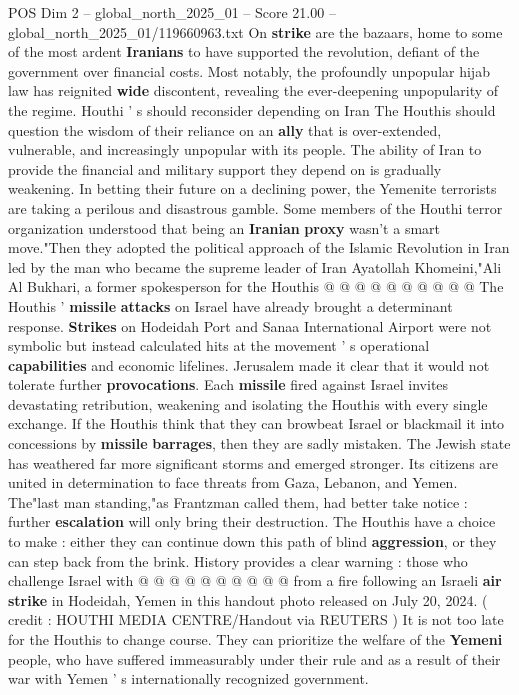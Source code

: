 \begin{textsample}{POS Dim 2 – global\_north\_2025\_01 – Score 21.00 – global\_north\_2025\_01/119660963.txt}
On \textbf{strike} are the bazaars, home to some of the most ardent \textbf{Iranians} to have supported the revolution, defiant of the government over financial costs.
Most notably, the profoundly unpopular hijab law has reignited \textbf{wide} discontent, revealing the ever-deepening unpopularity of the regime.
Houthi ' s should reconsider depending on Iran The Houthis should question the wisdom of their reliance on an \textbf{ally} that is over-extended, vulnerable, and increasingly unpopular with its people.
The ability of Iran to provide the financial and military support they depend on is gradually weakening.
In betting their future on a declining power, the Yemenite terrorists are taking a perilous and disastrous gamble.
Some members of the Houthi terror organization understood that being an \textbf{Iranian} \textbf{proxy} wasn't a smart move."Then they adopted the political approach of the Islamic Revolution in Iran led by the man who became the supreme leader of Iran Ayatollah Khomeini,"Ali Al Bukhari, a former spokesperson for the Houthis @ @ @ @ @ @ @ @ @ @ The Houthis ' \textbf{missile} \textbf{attacks} on Israel have already brought a determinant response. \textbf{Strikes} on Hodeidah Port and Sanaa International Airport were not symbolic but instead calculated hits at the movement ' s operational \textbf{capabilities} and economic lifelines.
Jerusalem made it clear that it would not tolerate further \textbf{provocations}.
Each \textbf{missile} fired against Israel invites devastating retribution, weakening and isolating the Houthis with every single exchange.
If the Houthis think that they can browbeat Israel or blackmail it into concessions by \textbf{missile} \textbf{barrages}, then they are sadly mistaken.
The Jewish state has weathered far more significant storms and emerged stronger.
Its citizens are united in determination to face threats from Gaza, Lebanon, and Yemen.
The"last man standing,"as Frantzman called them, had better take notice : further \textbf{escalation} will only bring their destruction.
The Houthis have a choice to make : either they can continue down this path of blind \textbf{aggression}, or they can step back from the brink.
History provides a clear warning : those who challenge Israel with @ @ @ @ @ @ @ @ @ @ from a fire following an Israeli \textbf{air} \textbf{strike} in Hodeidah, Yemen in this handout photo released on July 20, 2024. ( credit : HOUTHI MEDIA CENTRE/Handout via REUTERS ) It is not too late for the Houthis to change course.
They can prioritize the welfare of the \textbf{Yemeni} people, who have suffered immeasurably under their rule and as a result of their war with Yemen ' s internationally recognized government.

\end{textsample}
